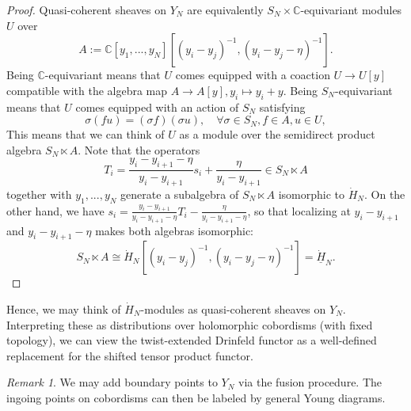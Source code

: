 \documentclass[11pt]{report}
\theoremstyle{definition}
\theoremstyle{remark}
\newtheorem*{remark}{Remark}
\theoremstyle{remark}
\newcommand{\C}{\mathbb{C}}
\begin{document}
\begin{proof}
Quasi-coherent sheaves on $Y_N$ are equivalently $S_N \times \C$-equivariant modules $U$ over
\begin{equation*}
A := \C[y_1,...,y_N][(y_i-y_j)^{-1},(y_i-y_j-\eta)^{-1}].
\end{equation*}
Being $\C$-equivariant means that $U$ comes equipped with a coaction $U \to U[y]$ compatible with the algebra map $A \to A[y], y_i \mapsto y_i+y$. Being $S_N$-equivariant means that $U$ comes equipped with an action of $S_N$ satisfying
\begin{equation*}
\sigma (f u) = (\sigma f) (\sigma u), \quad \forall \sigma \in S_N, f \in A, u \in U,
\end{equation*}
This means that we can think of $U$ as a module over the semidirect product algebra $S_N \ltimes A$. Note that the operators
\begin{equation*}
T_i = \frac{y_i-y_{i+1}-\eta}{y_i-y_{i+1}} s_i + \frac{\eta}{y_i-y_{i+1}} \in S_N \ltimes A
\end{equation*}
together with $y_1,...,y_N$ generate a subalgebra of $S_N \ltimes A$ isomorphic to $\dot H_N$. On the other hand, we have $s_i = \frac{y_i-y_{i+1}}{y_i-y_{i+1}-\eta} T_i - \frac{\eta}{y_i-y_{i+1}-\eta}$, so that localizing at $y_i-y_{i+1}$ and $y_i-y_{i+1}-\eta$ makes both algebras isomorphic:
\begin{equation*}
S_N \ltimes A \cong \dot H_N[(y_i-y_j)^{-1},(y_i-y_j-\eta)^{-1}] = \underline{\dot H}_N.
\end{equation*}
\end{proof}

Hence, we may think of $\dot H_N$-modules as quasi-coherent sheaves on $Y_N$. Interpreting these as distributions over holomorphic cobordisms (with fixed topology), we can view the twist-extended Drinfeld functor as a well-defined replacement for the shifted tensor product functor.

\begin{remark}
We may add boundary points to $Y_N$ via the fusion procedure. The ingoing points on cobordisms can then be labeled by general Young diagrams.
\end{remark}
\end{document}
